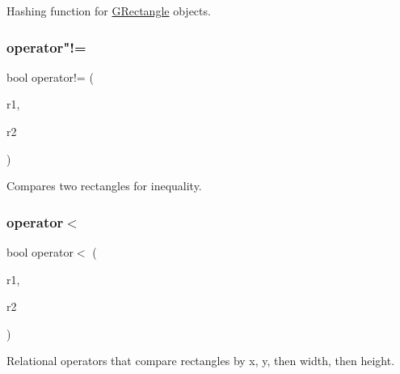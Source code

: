 Hashing function for \mbox{\hyperlink{classGRectangle}{G\+Rectangle}} objects. 

\mbox{\label{classGRectangle_ab1f9c96d97d7895bcd908ba94af3bed7}} 
\subsubsection{\texorpdfstring{operator"!=}{operator!=}}
{\footnotesize\ttfamily bool operator!= (\begin{DoxyParamCaption}\item[{const \mbox{\hyperlink{classGRectangle}{G\+Rectangle}} \&}]{r1,  }\item[{const \mbox{\hyperlink{classGRectangle}{G\+Rectangle}} \&}]{r2 }\end{DoxyParamCaption})\hspace{0.3cm}{\ttfamily [friend]}}



Compares two rectangles for inequality. 

\mbox{\label{classGRectangle_a4a0fc8587bc8eccebfdd62416942c5d8}} 
\subsubsection{\texorpdfstring{operator$<$}{operator<}}
{\footnotesize\ttfamily bool operator$<$ (\begin{DoxyParamCaption}\item[{const \mbox{\hyperlink{classGRectangle}{G\+Rectangle}} \&}]{r1,  }\item[{const \mbox{\hyperlink{classGRectangle}{G\+Rectangle}} \&}]{r2 }\end{DoxyParamCaption})\hspace{0.3cm}{\ttfamily [friend]}}



Relational operators that compare rectangles by x, y, then width, then height. 

\mbox{\label{classGRectangle_a9986499c29c915ee31d512f44a8f8a0d}} 
